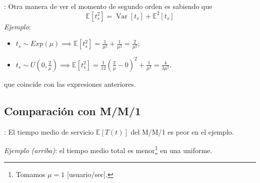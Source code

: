 \documentclass[xcolor={x11names}]{beamer}
\DeclareMathOperator{\Var}{Var}
\begin{document}
\begin{frame}{\secname: \subsecname}
    Otra manera de ver el momento de
    segundo orden es sabiendo que
    \begin{equation*}
        \mathbb{E}[t_s^2]=\Var[t_s]+
        \mathbb{E}^2[t_s]
    \end{equation*}
    \vfill
    \textit{Ejemplo}:
    \begin{itemize}
        \item $t_s\sim Exp(\mu)\implies
            \mathbb{E}[t_s^2]=\frac{1}{\mu^2}+
            \frac{1}{\mu^2}=\frac{2}{\mu^2}$;
        \item $t_s\sim U\left(0,\tfrac{2}{\mu}
            \right)
            \implies
            \mathbb{E}[t_s^2]=\frac{1}{12}
            \left(\frac{2}{\mu}-0\right)^2+
            \frac{1}{\mu^2}
            =\frac{4}{3\mu^2}$.
    \end{itemize}
    que coincide con las expresiones anteriores.
\end{frame}


\subsection{Comparación con M/M/1}
\begin{frame}{\secname: \subsecname}
    El tiempo medio de servicio
    $\mathbb{E}[T(t)]$
    del M/M/1
    es peor en el ejemplo. 

    \vfill


    \begin{figure}
        
    \end{figure}
    \textit{Ejemplo (arriba)}: el tiempo medio
    total es menor\footnote{
        Tomamos $\mu=1$
    [usuario/sec].} en una
    uniforme.


\end{frame}






\end{document}
